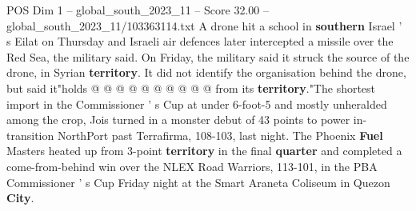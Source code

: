 \begin{textsample}{POS Dim 1 – global\_south\_2023\_11 – Score 32.00 – global\_south\_2023\_11/103363114.txt}
A drone hit a school in \textbf{southern} Israel ' s Eilat on Thursday and Israeli air defences later intercepted a missile over the Red Sea, the military said.
On Friday, the military said it struck the source of the drone, in Syrian \textbf{territory}.
It did not identify the organisation behind the drone, but said it"holds @ @ @ @ @ @ @ @ @ @ from its \textbf{territory}."The shortest import in the Commissioner ' s Cup at under 6-foot-5 and mostly unheralded among the crop, Jois turned in a monster debut of 43 points to power in-transition NorthPort past Terrafirma, 108-103, last night.
The Phoenix \textbf{Fuel} Masters heated up from 3-point \textbf{territory} in the final \textbf{quarter} and completed a come-from-behind win over the NLEX Road Warriors, 113-101, in the PBA Commissioner ' s Cup Friday night at the Smart Araneta Coliseum in Quezon \textbf{City}.

\end{textsample}
